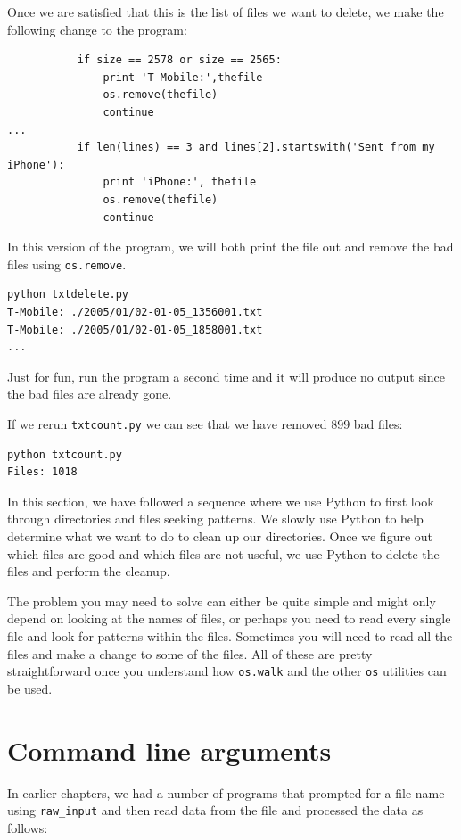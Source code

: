 \documentclass[11pt]{book}
\begin{document}
Once we are satisfied that this is the list of files we want to delete,
we make the following change to the program:

\beforeverb
\begin{verbatim}
           if size == 2578 or size == 2565:
               print 'T-Mobile:',thefile
               os.remove(thefile)
               continue
...
           if len(lines) == 3 and lines[2].startswith('Sent from my iPhone'):
               print 'iPhone:', thefile
               os.remove(thefile)
               continue
\end{verbatim}
\afterverb
%
In this version of the program, we will both print the file out 
and remove the bad files
using {\tt os.remove}.

\beforeverb
\begin{verbatim}
python txtdelete.py 
T-Mobile: ./2005/01/02-01-05_1356001.txt
T-Mobile: ./2005/01/02-01-05_1858001.txt
...
\end{verbatim}
\afterverb
%
Just for fun, run the program a second time and it will produce no output
since the bad files are already gone.

If we rerun {\tt txtcount.py} we can see that we have removed
899 bad files:
\beforeverb
\begin{verbatim}
python txtcount.py 
Files: 1018
\end{verbatim}
\afterverb
%
In this section, we have followed a sequence where we use Python 
to first look through directories and files seeking
patterns.  We slowly use Python to help determine what we 
want to do to clean up our directories.  Once we
figure out which files are good and which files are 
not useful, we use Python to delete the files and 
perform the cleanup.

The problem you may need to solve can either be quite simple 
and might only depend on looking at the names of files,
or perhaps you need to read every single file and
look for patterns within the files.  Sometimes 
you will need to read all the files and make a change 
to some of the files.  All of these are pretty 
straightforward once you understand how {\tt os.walk}
and the other {\tt os} utilities can be used.

\section{Command line arguments}


In earlier chapters, we had a number of programs that prompted
for a file name using \verb"raw_input" and then read data 
from the file and processed the data as follows:
\end{document}
